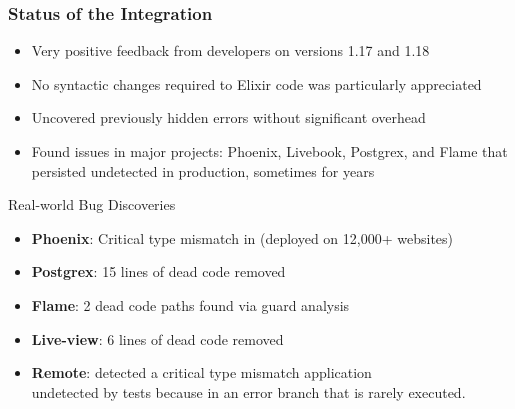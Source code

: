 \begin{frame}[fragile]
\frametitle{Status of the Integration}\vspace{-3mm}
\begin{itemize}
\item Very positive feedback from developers on versions 1.17 and 1.18
\item No syntactic changes required to Elixir code was particularly appreciated
\item Uncovered previously hidden errors without significant overhead
\item Found issues in major projects: Phoenix, Livebook, Postgrex, and Flame that persisted undetected in production, sometimes for years
\end{itemize}

\bigskip\pause

\begin{block}{Real-world Bug Discoveries}
\begin{itemize}
    \setlength{\itemsep}{0pt}
\item \textbf{Phoenix}: Critical type mismatch in  \hfill\small (deployed on 12,000+ websites)
\item \textbf{Postgrex}: 15 lines of dead code removed
\item \textbf{Flame}: 2 dead code paths found via guard analysis
\item \textbf{Live-view}: 6 lines of dead code removed
\item \textbf{Remote}: detected a critical type mismatch application\\ undetected by tests because in an error branch that is rarely executed.\vspace{-1mm}
\end{itemize}
\end{block}
\end{frame}

